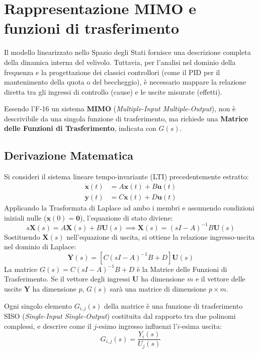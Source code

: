 \section{Rappresentazione MIMO e funzioni di trasferimento}
Il modello linearizzato nello Spazio degli Stati fornisce una descrizione completa della dinamica interna del velivolo. Tuttavia, per l'analisi nel dominio della frequenza e la progettazione dei classici controllori (come il PID per il mantenimento della quota o del beccheggio), è necessario mappare la relazione diretta tra gli ingressi di controllo (cause) e le uscite misurate (effetti).

Essendo l'F-16 un sistema \textbf{MIMO} (\textit{Multiple-Input Multiple-Output}), non è descrivibile da una singola funzione di trasferimento, ma richiede una \textbf{Matrice delle Funzioni di Trasferimento}, indicata con $G(s)$.

\subsection{Derivazione Matematica}
Si consideri il sistema lineare tempo-invariante (LTI) precedentemente estratto:
\begin{align}
\dot{\mathbf{x}}(t) &= A \mathbf{x}(t) + B \mathbf{u}(t) \\
\mathbf{y}(t) &= C \mathbf{x}(t) + D \mathbf{u}(t)
\end{align}
Applicando la Trasformata di Laplace ad ambo i membri e assumendo condizioni iniziali nulle ($\mathbf{x}(0) = \mathbf{0}$), l'equazione di stato diviene:
\begin{equation}
s\mathbf{X}(s) = A \mathbf{X}(s) + B \mathbf{U}(s) \implies \mathbf{X}(s) = (sI - A)^{-1} B \mathbf{U}(s)
\end{equation}
Sostituendo $\mathbf{X}(s)$ nell'equazione di uscita, si ottiene la relazione ingresso-uscita nel dominio di Laplace:
\begin{equation}
\mathbf{Y}(s) = \left[ C(sI - A)^{-1} B + D \right] \mathbf{U}(s)
\end{equation}
La matrice $G(s) = C(sI - A)^{-1} B + D$ è la Matrice delle Funzioni di Trasferimento. Se il vettore degli ingressi $\mathbf{U}$ ha dimensione $m$ e il vettore delle uscite $\mathbf{Y}$ ha dimensione $p$, $G(s)$ sarà una matrice di dimensione $p \times m$. 

Ogni singolo elemento $G_{i,j}(s)$ della matrice è una funzione di trasferimento SISO (\textit{Single-Input Single-Output}) costituita dal rapporto tra due polinomi complessi, e descrive come il $j$-esimo ingresso influenzi l'$i$-esima uscita:
\begin{equation}
G_{i,j}(s) = \frac{Y_i(s)}{U_j(s)}
\end{equation}

